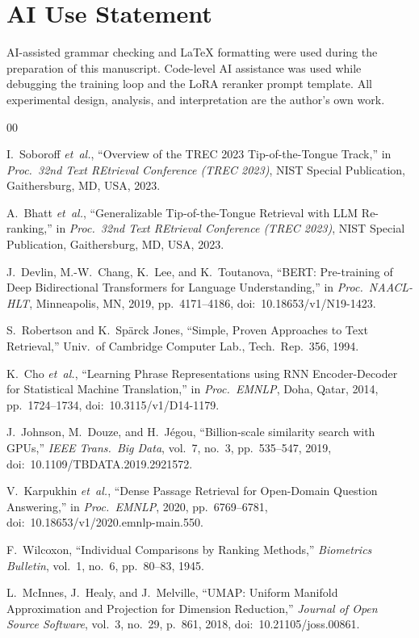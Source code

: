 \documentclass[conference]{IEEEtran}
\begin{document}
\section*{AI Use Statement}
AI-assisted grammar checking and LaTeX formatting were used during the
preparation of this manuscript. Code-level AI assistance was used while
debugging the training loop and the LoRA reranker prompt template. All
experimental design, analysis, and interpretation are the author's own
work.

\begin{thebibliography}{00}

I.~Soboroff \emph{et~al.}, ``Overview of the TREC 2023 Tip-of-the-Tongue
Track,'' in \emph{Proc.\ 32nd Text REtrieval Conference (TREC 2023)},
NIST Special Publication, Gaithersburg, MD, USA, 2023.

A.~Bhatt \emph{et~al.}, ``Generalizable Tip-of-the-Tongue Retrieval with
LLM Re-ranking,'' in \emph{Proc.\ 32nd Text REtrieval Conference (TREC 2023)},
NIST Special Publication, Gaithersburg, MD, USA, 2023.

J.~Devlin, M.-W.~Chang, K.~Lee, and K.~Toutanova, ``BERT: Pre-training of
Deep Bidirectional Transformers for Language Understanding,''
in \emph{Proc.\ NAACL-HLT}, Minneapolis, MN, 2019, pp.\ 4171--4186,
doi:~10.18653/v1/N19-1423.

S.~Robertson and K.~Sp\"arck Jones, ``Simple, Proven Approaches to Text
Retrieval,'' Univ.\ of Cambridge Computer Lab., Tech.\ Rep.~356, 1994.

K.~Cho \emph{et~al.}, ``Learning Phrase Representations using RNN
Encoder-Decoder for Statistical Machine Translation,'' in \emph{Proc.\
EMNLP}, Doha, Qatar, 2014, pp.\ 1724--1734, doi:~10.3115/v1/D14-1179.

J.~Johnson, M.~Douze, and H.~J\'egou, ``Billion-scale similarity search
with GPUs,'' \emph{IEEE Trans.\ Big Data}, vol.~7, no.~3, pp.~535--547,
2019, doi:~10.1109/TBDATA.2019.2921572.

V.~Karpukhin \emph{et~al.}, ``Dense Passage Retrieval for Open-Domain
Question Answering,'' in \emph{Proc.\ EMNLP}, 2020, pp.\ 6769--6781,
doi:~10.18653/v1/2020.emnlp-main.550.

F.~Wilcoxon, ``Individual Comparisons by Ranking Methods,''
\emph{Biometrics Bulletin}, vol.~1, no.~6, pp.~80--83, 1945.

L.~McInnes, J.~Healy, and J.~Melville, ``UMAP: Uniform Manifold
Approximation and Projection for Dimension Reduction,'' \emph{Journal
of Open Source Software}, vol.~3, no.~29, p.~861, 2018,
doi:~10.21105/joss.00861.

\end{thebibliography}
\end{document}
